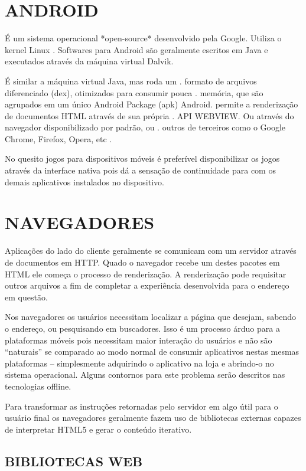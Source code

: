 \documentclass[11pt,a4paper]{article}
\begin{document}
\section{ANDROID}

É um sistema operacional *open-source* desenvolvido pela Google.
Utiliza o kernel Linux .
Softwares para Android são geralmente escritos em Java e executados
através da máquina virtual Dalvik.

É similar a máquina virtual Java, mas roda um  .
formato de arquivos diferenciado (dex), otimizados para consumir pouca .
memória, que são agrupados em um único Android Package (apk) Android.
permite a renderização de documentos HTML através de sua própria   .
API WEBVIEW. Ou através do navegador disponibilizado por padrão, ou  .
outros de terceiros como o Google Chrome, Firefox, Opera, etc          .

No quesito jogos para dispositivos móveis é preferível disponibilizar
os jogos através da interface nativa pois dá a sensação de
continuidade para com os demais aplicativos instalados no dispositivo.



\section{NAVEGADORES}

Aplicações do lado do cliente geralmente se comunicam com um
servidor através de documentos em HTTP. Quado o navegador recebe um
destes pacotes em HTML ele começa o processo de renderização. A
renderização pode requisitar outros arquivos a fim de completar a
experiência desenvolvida para o endereço em questão.

Nos navegadores os usuários necessitam localizar a página que desejam,
sabendo o endereço, ou pesquisando em buscadores. Isso é um processo
árduo para a plataformas móveis pois necessitam maior interação
do usuários e não são “naturais” se comparado ao modo normal
de consumir aplicativos nestas mesmas plataformas – simplesmente
adquirindo o aplicativo na loja e abrindo-o no sistema operacional.
Alguns contornos para este problema serão descritos nas tecnologias
offline.

Para transformar as instruções retornadas pelo servidor em algo útil
para o usuário final os navegadores geralmente fazem uso de bibliotecas
externas capazes de interpretar HTML5 e gerar o conteúdo iterativo.

\subsection{BIBLIOTECAS WEB}
\end{document}
